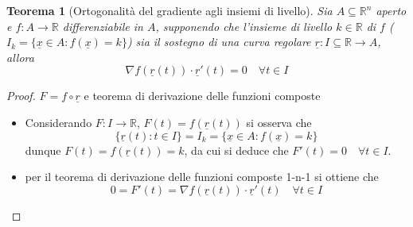 \documentclass[12pt, a4paper]{article}
\theoremstyle{break}
\newtheorem{theorem}{Teorema} %
\begin{document}
\newpage
\begin{theorem} [Ortogonalità del gradiente agli insiemi di livello]
	Sia $A \subseteq \mathbb{R}^n$ aperto e $f: A \to \mathbb{R}$
	differenziabile in $A$, supponendo che l'insieme di livello $k \in
		\mathbb{R}$ di $f$ ($I_k = \{\underline{x} \in A: f(\underline{x}) = k
		\}$) sia il sostegno di una curva regolare $\underline{r}: I \subseteq
		\mathbb{R} \to A$, allora
	\[
		\nabla f(\underline{r}(t)) \cdot \underline{r}'(t) = 0 \quad \forall t
		\in I
	\]
\end{theorem}
\begin{proof} $F = f \circ \underline{r}$ e teorema di derivazione
	delle funzioni composte
	\begin{itemize}
		\item Considerando $F:I \to \mathbb{R}$, $F(t) = f(\underline{r}(t))$
		      si osserva che
		      \[
			      \{\underline{r}(t): t \in I\} = I_k = \{\underline{x} \in A:
			      f(\underline{x}) = k \}
		      \]
		      dunque $F(t) = f(\underline{r}(t)) = k$, da cui si deduce che
		      $F'(t) = 0 \quad \forall t \in I$.
		\item per il teorema di derivazione delle funzioni composte 1-n-1 si
		      ottiene che
		      \[
			      0 = F'(t) = \nabla f(\underline{r}(t)) \cdot \underline{r}'(t)
			      \quad \forall t \in I
		      \]
	\end{itemize}
\end{proof}
\end{document}
